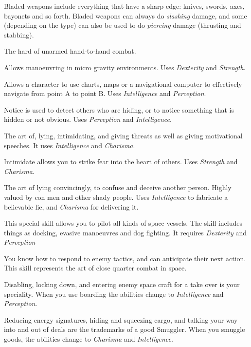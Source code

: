\begin{description}
   Bladed weapons include everything that have a
  sharp edge: knives, swords, axes, bayonets and so forth. Bladed weapons can
  always do \emph{slashing} damage, and some (depending on the type) can also
  be used to do \emph{piercing} damage (thrusting and stabbing).

   The hard of unarmed hand-to-hand combat.

   Allows manoeuvring in micro gravity environments. Uses
  \emph{Dexterity} and \emph{Strength}.

   Allows a character to use charts, maps or a navigational
  computer to effectively navigate from point A to point B. Uses
  \emph{Intelligence} and \emph{Perception}.

   Notice is used to detect others who are hiding, or to notice
  something that is hidden or not obvious. Uses \emph{Perception} and
  \emph{Intelligence}.

   The art of, lying, intimidating, and giving threats as well
  as giving motivational speeches. It uses \emph{Intelligence} and \emph{Charisma}.

   Intimidate allows you to strike
  fear into the heart of others. Uses \emph{Strength} and \emph{Charisma}.

   The art of lying convincingly,
  to confuse and deceive another person. Highly valued by con men and other
  shady people. Uses \emph{Intelligence} to fabricate a believable lie, and
  \emph{Charisma} for delivering it.

   This special skill allows you to pilot all
  kinds of space vessels. The skill includes things as docking, evasive
  manoeuvres and dog fighting. It requires \emph{Dexterity} and
  \emph{Perception}

   You know how to respond to
  enemy tactics, and can anticipate their next action. This skill represents the
  art of close quarter combat in space.

   Disabling, locking down, and
  entering enemy space craft for a take over is your speciality. When you use
  boarding the abilities change to \emph{Intelligence} and \emph{Perception}.

   Reducing energy signatures,
  hiding and squeezing cargo, and talking your way into and out of deals are the
  trademarks of a good Smuggler. When you smuggle goods, the abilities change to
  \emph{Charisma} and \emph{Intelligence}.


\end{description}
